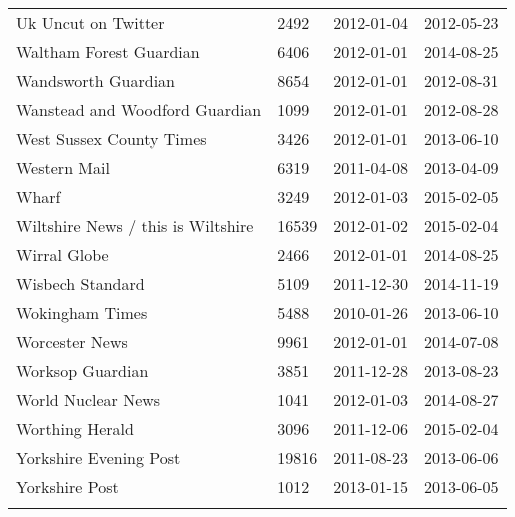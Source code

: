 \begin{longtable}{p{}p{}p{}p{}}
  Uk Uncut on Twitter & 2492 & 2012-01-04 & 2012-05-23 \\ 
  Waltham Forest Guardian & 6406 & 2012-01-01 & 2014-08-25 \\ 
  Wandsworth Guardian & 8654 & 2012-01-01 & 2012-08-31 \\ 
  Wanstead and Woodford Guardian & 1099 & 2012-01-01 & 2012-08-28 \\ 
  West Sussex County Times & 3426 & 2012-01-01 & 2013-06-10 \\ 
  Western Mail & 6319 & 2011-04-08 & 2013-04-09 \\ 
  Wharf & 3249 & 2012-01-03 & 2015-02-05 \\ 
  Wiltshire News / this is Wiltshire & 16539 & 2012-01-02 & 2015-02-04 \\ 
  Wirral Globe & 2466 & 2012-01-01 & 2014-08-25 \\ 
  Wisbech Standard & 5109 & 2011-12-30 & 2014-11-19 \\ 
  Wokingham Times & 5488 & 2010-01-26 & 2013-06-10 \\ 
  Worcester News & 9961 & 2012-01-01 & 2014-07-08 \\ 
  Worksop Guardian & 3851 & 2011-12-28 & 2013-08-23 \\ 
  World Nuclear News & 1041 & 2012-01-03 & 2014-08-27 \\ 
  Worthing Herald & 3096 & 2011-12-06 & 2015-02-04 \\ 
  Yorkshire Evening Post & 19816 & 2011-08-23 & 2013-06-06 \\ 
  Yorkshire Post & 1012 & 2013-01-15 & 2013-06-05 \\ 
   \hline
\hline
\label{tab:summary}
\end{longtable}
\endgroup
